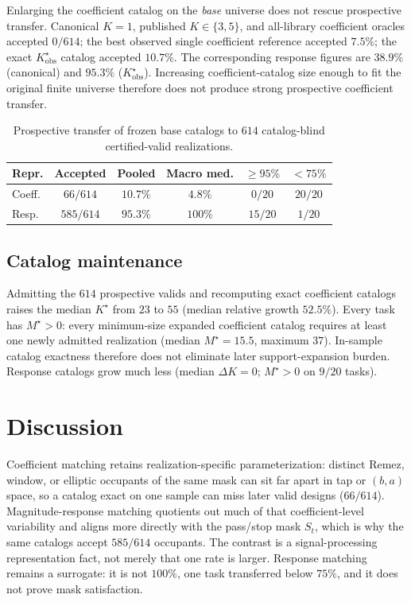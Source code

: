 \documentclass{article}
\begin{document}
Enlarging the coefficient catalog on the \emph{base} universe does
not rescue prospective transfer.
Canonical $K{=}1$, published $K{\in}\{3,5\}$, and all-library
coefficient oracles accepted $0/614$; the best observed single
coefficient reference accepted $7.5\%$; the exact
$K^\star_{\mathrm{obs}}$ catalog accepted $10.7\%$.
The corresponding response figures are $38.9\%$ (canonical) and
$95.3\%$ ($K^\star_{\mathrm{obs}}$).
Increasing coefficient-catalog size enough to fit the original
finite universe therefore does not produce strong prospective
coefficient transfer.

\begin{table}[t]
\caption{Prospective transfer of frozen base catalogs to $614$
catalog-blind certified-valid realizations.}
\label{tab:xfer}
\centering
\setlength{\tabcolsep}{3.6pt}
\begin{tabular}{lccccc}
\toprule
Repr. & Accepted & Pooled & Macro med. & ${\ge}95\%$ & ${<}75\%$ \\
\midrule
Coeff. & $66/614$ & $10.7\%$ & $4.8\%$ & $0/20$ & $20/20$ \\
Resp.  & $585/614$ & $95.3\%$ & $100\%$ & $15/20$ & $1/20$ \\
\bottomrule
\end{tabular}
\end{table}

\subsection{Catalog maintenance}
Admitting the $614$ prospective valids and recomputing exact
coefficient catalogs raises the median $K^\star$ from $23$ to
$55$ (median relative growth $52.5\%$).
Every task has $M^\star>0$: every minimum-size expanded
coefficient catalog requires at least one newly admitted
realization (median $M^\star=15.5$, maximum $37$).
In-sample catalog exactness therefore does not eliminate later
support-expansion burden.
Response catalogs grow much less (median $\Delta K=0$;
$M^\star>0$ on $9/20$ tasks).

\section{Discussion}
\label{sec:disc}

Coefficient matching retains realization-specific
parameterization: distinct Remez, window, or elliptic
occupants of the same mask can sit far apart in tap or
$(b,a)$ space, so a catalog exact on one sample can miss later
valid designs ($66/614$).
Magnitude-response matching quotients out much of that
coefficient-level variability and aligns more directly with the
pass/stop mask $S_t$, which is why the same catalogs accept
$585/614$ occupants.
The contrast is a signal-processing representation fact, not
merely that one rate is larger.
Response matching remains a surrogate: it is not $100\%$, one
task transferred below $75\%$, and it does not prove mask
satisfaction.
\end{document}
